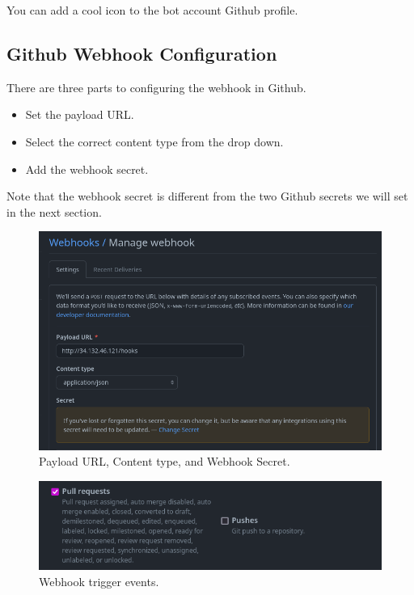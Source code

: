 \justifying
You can add a cool icon to the bot account Github profile.


\subsection{\label{sec:webhook}Github Webhook Configuration}

\justifying
There are three parts to configuring the webhook in Github. 

\justifying
\begin{raggedright}
	\begin{itemize}
		\item Set the payload URL.
		\item Select the correct content type from the drop down.
		\item Add the webhook secret.
	\end{itemize}
\end{raggedright}
\vspace{2mm}

\justifying
Note that the webhook secret is different from the two Github secrets we will set in the next section.

\begin{figure}[ht]
	\includegraphics[width=12cm]{images/webhook1.png}
	\caption{Payload URL, Content type, and Webhook Secret.}
	\label{wh1}
\end{figure}
\vspace{2mm}


\begin{figure}[ht]
	\includegraphics[width=12cm]{images/webhook2.png}
	\caption{Webhook trigger events.}
	\label{wh2}
\end{figure}
\vspace{2mm}

